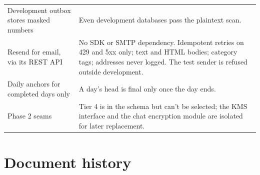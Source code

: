 \begin{longtable}{@{}L{4.4cm}p{10.8cm}@{}}
Development outbox stores masked numbers & Even development databases pass the plaintext scan. \\
Resend for email, via its REST API & No SDK or SMTP dependency. Idempotent retries on 429 and 5xx only; text and HTML bodies; category tags; addresses never logged. The test sender is refused outside development. \\
Daily anchors for completed days only & A day's head is final only once the day ends. \\
Phase 2 seams & Tier 4 is in the schema but can't be selected; the KMS interface and the chat encryption module are isolated for later replacement. \\
\bottomrule
\end{longtable}

\section*{Document history}

